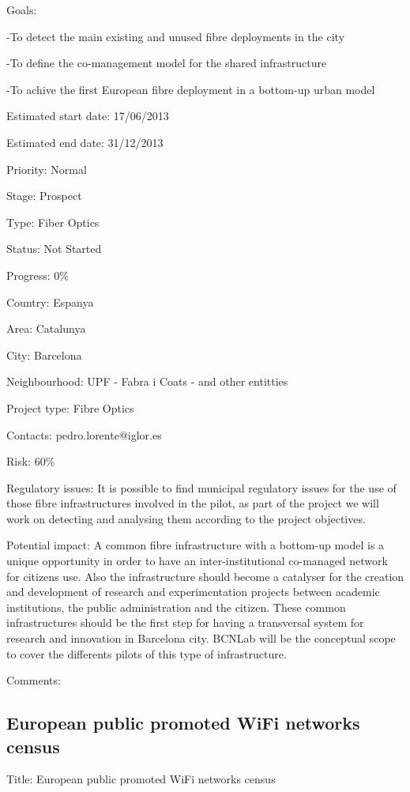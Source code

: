 \documentclass[draftclsnofoot,12pt,journal,onecolumn]{IEEEtran}
\begin{document}
Goals: 

-To detect the main existing and unused fibre deployments in the city 

-To define the co-management model for the shared infrastructure 

-To achive the first European fibre deployment in a bottom-up urban model 

Estimated start date: 17/06/2013 

Estimated end date: 31/12/2013 

Priority: Normal 

Stage: Prospect 

Type: Fiber Optics 

Status: Not Started 

Progress: 0\% 

Country: Espanya 

Area: Catalunya 

City: Barcelona 

Neighbourhood: UPF - Fabra i Coats - and other entitties 

Project type: Fibre Optics 

Contacts: pedro.lorente@iglor.es

Risk: 60\% 

Regulatory issues: It is possible to find municipal regulatory issues for the 
use of those fibre infrastructures involved in the pilot, as part of the 
project we will work on detecting and analysing them according to the project 
objectives. 

Potential impact: A common fibre infrastructure with a bottom-up model is a 
unique opportunity in order to have an inter-institutional co-managed network 
for citizens use. Also the infrastructure should become a catalyser for the 
creation and development of research and experimentation projects between 
academic institutions, the public administration and the citizen. These 
common infrastructures should be the first step for having a transversal 
system for research and innovation in Barcelona city. BCNLab will be the 
conceptual scope to cover the differents pilots of this type of 
infrastructure. 

Comments: 

\subsection{European public promoted WiFi networks census} 

Title: European public promoted WiFi networks census 
\end{document}
